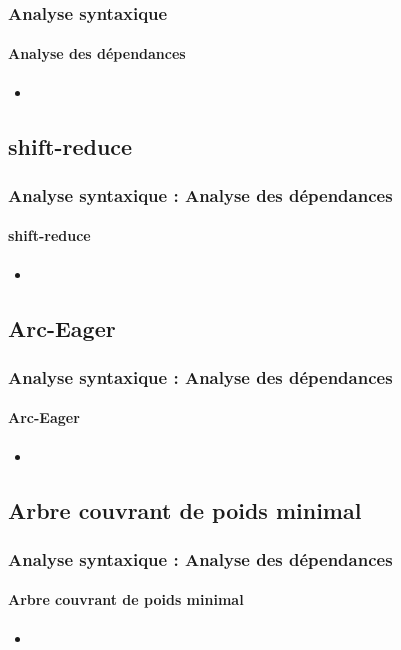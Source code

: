 \documentclass[xcolor=table]{beamer}
\begin{document}
\begin{frame}
\frametitle{Analyse syntaxique}
\framesubtitle{Analyse des dépendances}

\begin{itemize}
	\item 
\end{itemize}

\end{frame}

\subsection{shift-reduce}

\begin{frame}
\frametitle{Analyse syntaxique : Analyse des dépendances}
\framesubtitle{shift-reduce}

\begin{itemize}
	\item 
\end{itemize}

\end{frame}

\subsection{Arc-Eager}

\begin{frame}
\frametitle{Analyse syntaxique : Analyse des dépendances}
\framesubtitle{Arc-Eager}

\begin{itemize}
	\item 
\end{itemize}

\end{frame}

\subsection{Arbre couvrant de poids minimal}

\begin{frame}
\frametitle{Analyse syntaxique : Analyse des dépendances}
\framesubtitle{Arbre couvrant de poids minimal}

\begin{itemize}
	\item 
\end{itemize}

\end{frame}

\end{document}
